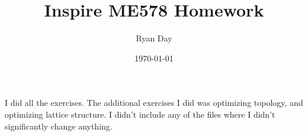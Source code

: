 \documentclass[a4paper]{article}
\title{Inspire ME578 Homework}
\author{Ryan Day}
\date{\today}
\begin{document}
    I did all the exercises. The additional exercises I did was optimizing topology, and optimizing lattice structure.
    I didn't include any of the files where I didn't significantly change anything.
\end{document}
